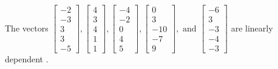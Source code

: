 \begin{exercise}
\begin{exerciseStatement}
  \end{exerciseStatement}
  \begin{exerciseAnswer}
   The vectors \(\left[\begin{array}{r}
-2 \\
-3 \\
3 \\
3 \\
-5
\end{array}\right] , \left[\begin{array}{r}
4 \\
3 \\
4 \\
1 \\
1
\end{array}\right] , \left[\begin{array}{r}
-4 \\
-2 \\
0 \\
4 \\
5
\end{array}\right] , \left[\begin{array}{r}
0 \\
3 \\
-10 \\
-7 \\
9
\end{array}\right] , \text{ and } \left[\begin{array}{r}
-6 \\
3 \\
-3 \\
-4 \\
-3
\end{array}\right]\) are 
  	 linearly dependent  .
  


  \end{exerciseAnswer}
\end{exercise}